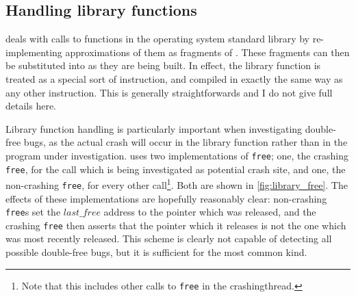 \subsection{Handling library functions}
\label{sect:derive:library_functions}

{\Technique} deals with calls to functions in the operating system
standard library by re-implementing approximations of them as
fragments of {\StateMachine}.  These fragments can then be substituted
into {\StateMachines} as they are being built.  In effect, the library
function is treated as a special sort of instruction, and compiled in
exactly the same way as any other instruction.  This is generally
straightforwards and I do not give full details here.

Library function handling is particularly important when investigating
double-free bugs, as the actual crash will occur in the library
function rather than in the program under investigation.  {\Technique}
uses two implementations of \texttt{free}; one, the crashing
\texttt{free}, for the call which is being investigated as potential
crash site, and one, the non-crashing \texttt{free}, for every other
call\footnote{Note that this includes other calls to \texttt{free} in
  the \gls{crashingthread}.}.  Both are shown in
\autoref{fig:library_free}.  The effects of these implementations are
hopefully reasonably clear: non-crashing \texttt{free}s set the
$\mathit{last\_free}$ address to the pointer which was released, and
the crashing \texttt{free} then asserts that the pointer which it
releases is not the one which was most recently released.  This scheme
is clearly not capable of detecting all possible double-free bugs, but
it is sufficient for the most common kind.

